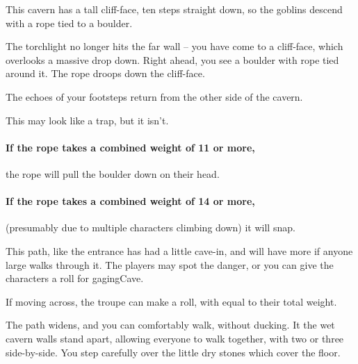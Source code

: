 \begin{multicols}{2}



\begin{exampletext}
  This cavern has a tall cliff-face, ten \glspl{step} straight down, so the goblins descend with a rope tied to a boulder.
\end{exampletext}

\begin{boxtext}
  The torchlight no longer hits the far wall -- you have come to a cliff-face, which overlooks a massive drop down.
  Right ahead, you see a boulder with rope tied around it.
  The rope droops down the cliff-face.

  The echoes of your footsteps return from the other side of the cavern.
\end{boxtext}

This may look like a trap, but it isn't.

\paragraph{If the rope takes a combined \gls{weight} of 11 or more,}
the rope will pull the boulder down on their head.

\paragraph{If the rope takes a combined \gls{weight} of 14 or more,}
(presumably due to multiple characters climbing down) it will snap.




This path, like the entrance has had a little cave-in, and will have more if anyone large walks through it.
The players may spot the danger, or you can give the characters a roll for \gls{gagingCave}.

If moving across, the troupe can make a  roll, with  equal to their total \gls{weight}.

\begin{boxtext}
  The path widens, and you can comfortably walk, without ducking.
  It the wet cavern walls stand apart, allowing everyone to walk together, with two or three side-by-side.
  You step carefully over the little dry stones which cover the floor.
\end{boxtext}


\end{multicols}
